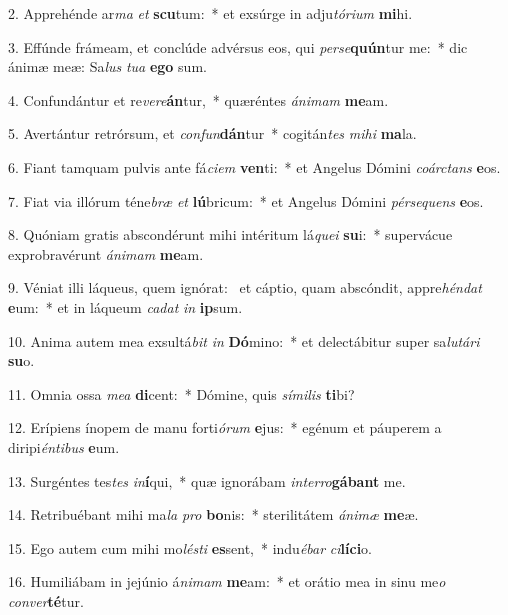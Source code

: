 2. Apprehénde ar\textit{ma} \textit{et} \textbf{scu}tum:~*  et exsúrge in adju\textit{tó}\textit{ri}\textit{um} \textbf{mi}hi.\

3. Effúnde frámeam, et conclúde advérsus eos, qui \textit{per}\textit{se}\textbf{quún}tur me:~*  dic ánimæ meæ: Sa\textit{lus} \textit{tu}\textit{a} \textbf{e}\textbf{go} sum.\

4. Confundántur et re\textit{ve}\textit{re}\textbf{án}tur,~*  quæréntes \textit{á}\textit{ni}\textit{mam} \textbf{me}am.\

5. Avertántur retrórsum, et \textit{con}\textit{fun}\textbf{dán}tur~*  cogitán\textit{tes} \textit{mi}\textit{hi} \textbf{ma}la.\

6. Fiant tamquam pulvis ante fá\textit{ci}\textit{em} \textbf{ven}ti:~*  et Angelus Dómini \textit{co}\textit{árc}\textit{tans} \textbf{e}os.\

7. Fiat via illórum téne\textit{bræ} \textit{et} \textbf{lú}bricum:~*  et Angelus Dómini \textit{pér}\textit{se}\textit{quens} \textbf{e}os.\

8. Quóniam gratis abscondérunt mihi intéritum lá\textit{que}\textit{i} \textbf{su}i:~*  supervácue exprobravérunt \textit{á}\textit{ni}\textit{mam} \textbf{me}am.\

9. Véniat illi láqueus, quem ignórat: \dag\  et cáptio, quam abscóndit, appre\textit{hén}\textit{dat} \textbf{e}um:~*  et in láqueum \textit{ca}\textit{dat} \textit{in} \textbf{ip}sum.\

10. Anima autem mea exsultá\textit{bit} \textit{in} \textbf{Dó}mino:~*  et delectábitur super sa\textit{lu}\textit{tá}\textit{ri} \textbf{su}o.\

11. Omnia ossa \textit{me}\textit{a} \textbf{di}cent:~*  Dómine, quis \textit{sí}\textit{mi}\textit{lis} \textbf{ti}bi?\

12. Erípiens ínopem de manu forti\textit{ó}\textit{rum} \textbf{e}jus:~*  egénum et páuperem a diripi\textit{én}\textit{ti}\textit{bus} \textbf{e}um.\

13. Surgéntes tes\textit{tes} \textit{in}\textbf{í}qui,~*  quæ ignorábam \textit{in}\textit{ter}\textit{ro}\textbf{gá}\textbf{bant} me.\

14. Retribuébant mihi ma\textit{la} \textit{pro} \textbf{bo}nis:~*  sterilitátem \textit{á}\textit{ni}\textit{mæ} \textbf{me}æ.\

15. Ego autem cum mihi mo\textit{lés}\textit{ti} \textbf{es}sent,~*  indu\textit{é}\textit{bar} \textit{ci}\textbf{lí}\textbf{ci}o.\

16. Humiliábam in jejúnio á\textit{ni}\textit{mam} \textbf{me}am:~*  et orátio mea in sinu me\textit{o} \textit{con}\textit{ver}\textbf{té}tur.\

